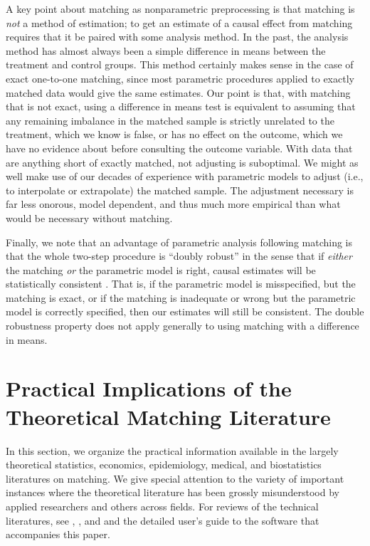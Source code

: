 \documentclass[11pt,titlepage]{article}
\begin{document}
A key point about matching as nonparametric preprocessing is that
matching is \emph{not} a method of estimation; to get an estimate of a
causal effect from matching requires that it be paired with some
analysis method.  In the past, the analysis method has almost always
been a simple difference in means between the treatment and control
groups.  This method certainly makes sense in the case of exact
one-to-one matching, since most parametric procedures applied to
exactly matched data would give the same estimates.  Our point is
that, with matching that is not exact, using a difference in means
test is equivalent to assuming that any remaining imbalance in the
matched sample is strictly unrelated to the treatment, which we know
is false, or has no effect on the outcome, which we have no evidence
about before consulting the outcome variable.  With data that are
anything short of exactly matched, not adjusting is suboptimal.  We
might as well make use of our decades of experience with parametric
models to adjust (i.e., to interpolate or extrapolate) the matched
sample.  The adjustment necessary is far less onorous, model
dependent, and thus much more empirical than what would be necessary
without matching.  

Finally, we note that an advantage of parametric analysis following
matching is that the whole two-step procedure is ``doubly robust'' in
the sense that if \emph{either} the matching \emph{or} the parametric
model is right, causal estimates will be statistically consistent
\citep[see][]{RobRot01}.  That is, if the parametric model is
misspecified, but the matching is exact, or if the matching is
inadequate or wrong but the parametric model is correctly specified,
then our estimates will still be consistent.  The double robustness
property does not apply generally to using matching with a difference
in means.


\section{Practical Implications of the Theoretical Matching Literature}\label{s:choose}

In this section, we organize the practical information available in
the largely theoretical statistics, economics, epidemiology, medical,
and biostatistics literatures on matching.  We give special attention
to the variety of important instances where the theoretical literature
has been grossly misunderstood by applied researchers and others
across fields.  For reviews of the technical literatures, see
\citet{Imbens04}, \citet{Rosenbaum02}, and \citet{Stuart04} and the
detailed user's guide to the software that accompanies this
paper.%
\end{document}
